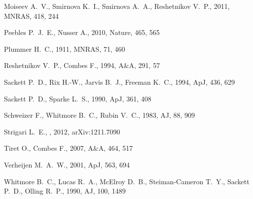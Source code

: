 \documentclass[useAMS,usenatbib]{mn2e}
\newcommand{\mnras}{MNRAS}
\newcommand{\apj}{ApJ}
\newcommand{\aap}{A\&A}
\newcommand{\nat}{Nature}
\newcommand{\aj}{AJ}
\begin{document}
\begin{thebibliography}{}
{Moiseev} A.~V.,  {Smirnova} K.~I.,  {Smirnova} A.~A.,    {Reshetnikov} V.~P.,
  2011, \mnras, 418, 244

{Peebles} P.~J.~E.,  {Nusser} A.,  2010, \nat, 465, 565

{Plummer} H.~C.,  1911, \mnras, 71, 460

{Reshetnikov} V.~P.,  {Combes} F.,  1994, \aap, 291, 57

{Sackett} P.~D.,  {Rix} H.-W.,  {Jarvis} B.~J.,    {Freeman} K.~C.,  1994,
  \apj, 436, 629

{Sackett} P.~D.,  {Sparke} L.~S.,  1990, \apj, 361, 408

{Schweizer} F.,  {Whitmore} B.~C.,    {Rubin} V.~C.,  1983, \aj, 88, 909

Strigari L.~E., , 2012, arXiv:1211.7090

{Tiret} O.,  {Combes} F.,  2007, \aap, 464, 517

{Verheijen} M.~A.~W.,  2001, \apj, 563, 694

{Whitmore} B.~C.,  {Lucas} R.~A.,  {McElroy} D.~B.,  {Steiman-Cameron} T.~Y.,
  {Sackett} P.~D.,    {Olling} R.~P.,  1990, \aj, 100, 1489

\end{thebibliography}
\end{document}
